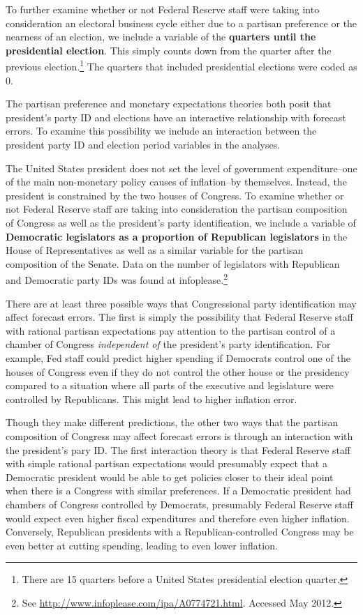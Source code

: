 \documentclass[a4paper]{article}\usepackage{graphicx, color}
\begin{document}
To further examine whether or not Federal Reserve staff were taking into consideration an electoral business cycle either due to a partisan preference or the nearness of an election, we include a variable of the {\bf{quarters until the presidential election}}. This simply counts down from the quarter after the previous election.\footnote{There are 15 quarters before a United States presidential election quarter.} The quarters that included presidential elections were coded as 0. 

The partisan preference and monetary expectations theories both posit that president's party ID and elections have an interactive relationship with forecast errors. To examine this possibility we include an interaction between the president party ID and election period variables in the analyses.

The United States president does not set the level of government expenditure--one of the main non-monetary policy causes of inflation--by themselves. Instead, the president is constrained by the two houses of Congress. To examine whether or not Federal Reserve staff are taking into consideration the partisan composition of Congress as well as the president's party identification, we include a variable of {\bf{Democratic legislators as a proportion of Republican legislators}} in the House of Representatives as well as a similar variable for the partisan composition of the Senate. Data on the number of legislators with Republican and Democratic party IDs was found at infoplease.\footnote{See {\url{http://www.infoplease.com/ipa/A0774721.html}}. Accessed May 2012.} 

There are at least three possible ways that Congressional party identification may affect forecast errors. The first is simply the possibility that Federal Reserve staff with rational partisan expectations pay attention to the partisan control of a chamber of Congress {\emph{independent of}} the president's party identification.  For example, Fed staff could predict higher spending if Democrats control one of the houses of Congress even if they do not control the other house or the presidency compared to a situation where all parts of the executive and legislature were controlled by Republicans. This might lead to higher inflation error.

Though they make different predictions, the other two ways that the partisan composition of Congress may affect forecast errors is through an interaction with the president's pary ID. The first interaction theory is that Federal Reserve staff with simple rational partisan expectations would presumably expect that a Democratic president would be able to get policies closer to their ideal point when there is a Congress with similar preferences. If a Democratic president had chambers of Congress controlled by Democrats, presumably Federal Reserve staff would expect even higher fiscal expenditures and therefore even higher inflation. Conversely, Republican presidents with a Republican-controlled Congress may be even better at cutting spending, leading to even lower inflation.
\end{document}
